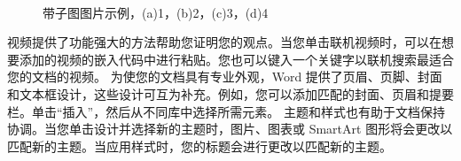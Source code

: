 \begin{figure}[H]
\centering
{}
\\
\hspace{3cm}

\caption{带子图图片示例，(a)1，(b)2，(c)3，(d)4}
\label{fig:binaural_recording}
\end{figure}

视频提供了功能强大的方法帮助您证明您的观点。当您单击联机视频时，可以在想要添加的视频的嵌入代码中进行粘贴。您也可以键入一个关键字以联机搜索最适合您的文档的视频。
为使您的文档具有专业外观，Word 提供了页眉、页脚、封面和文本框设计，这些设计可互为补充。例如，您可以添加匹配的封面、页眉和提要栏。单击“插入”，然后从不同库中选择所需元素。
主题和样式也有助于文档保持协调。当您单击设计并选择新的主题时，图片、图表或 SmartArt 图形将会更改以匹配新的主题。当应用样式时，您的标题会进行更改以匹配新的主题。


